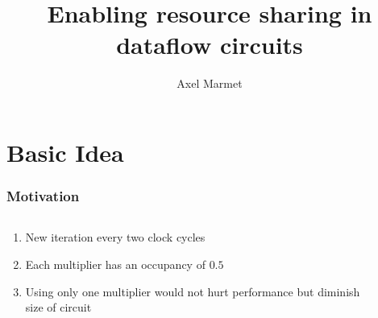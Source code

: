 \documentclass{beamer}
\title[Resource Sharing] %
{Enabling resource sharing in dataflow circuits}
\author[Marmet] %
{Axel Marmet}
\institute[EPFL] %
\date[EPFL 2019] %
\begin{document}
\frame{\titlepage}



\section{Basic Idea}
\begin{frame}[fragile]
\frametitle{Motivation}
\begin{columns}[T]
    \begin{column}{0.45\textwidth}
      \begin{enumerate}
          \item New iteration every two clock cycles
          \item Each multiplier has an occupancy of $0.5$
          \item Using only one multiplier would not hurt performance but diminish size of circuit
      \end{enumerate}
    \end{column}
    \begin{column}{0.1\textwidth}
    \end{column}
    \begin{column}{0.45\textwidth}

\end{column}
\end{columns}
\end{frame}
\end{document}

